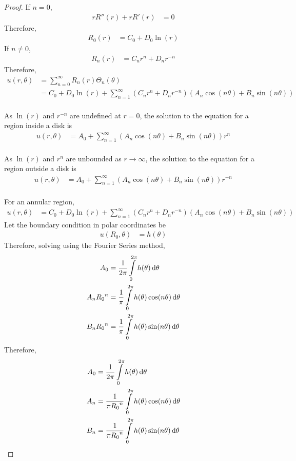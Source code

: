 \documentclass[titlepage, fleqn, a4paper, 12pt, twoside]{article}
\theoremstyle{definition}
\theoremstyle{theorem}
\begin{document}
\begin{proof}
	If $n = 0$,
	\begin{align*}
		r R''(r) + r R'(r) & = 0
	\end{align*}
	Therefore,
	\begin{align*}
		R_0(r) & = C_0 + D_0 \ln(r)
	\end{align*}
	If $n \neq 0$,
	\begin{align*}
		R_n(r) & = C_n r^n + D_n r^{-n}
	\end{align*}
	Therefore,
	\begin{align*}
		u(r,\theta) & = \sum\limits_{n = 0}^{\infty} R_n(r) \Theta_n(\theta) \\
                            & = C_0 + D_0 \ln(r) + \sum\limits_{n = 1}^{\infty} \left( C_n r^n + D_n r^{-n} \right) \left( A_n \cos(n \theta) + B_n \sin(n \theta) \right)
	\end{align*}
	~\\
	As $\ln(r)$ and $r^{-n}$ are undefined at $r = 0$, the solution to the equation for a region inside a disk is
	\begin{align*}
		u(r,\theta) & = A_0 + \sum\limits_{n = 1}^{\infty} \left( A_n \cos(n \theta) + B_n \sin(n \theta) \right) r^n
	\end{align*}
	~\\
	As $\ln(r)$ and $r^n$ are unbounded as $r \to \infty$, the solution to the equation for a region outside a disk is
	\begin{align*}
		u(r,\theta) & = A_0 + \sum\limits_{n = 1}^{\infty} \left( A_n \cos(n \theta) + B_n \sin(n \theta) \right) r^{-n}
	\end{align*}
	~\\
	For an annular region,
	\begin{align*}
		u(r,\theta) & = C_0 + D_0 \ln(r) + \sum\limits_{n = 1}^{\infty} \left( C_n r^n + D_n r^{-n} \right) \left( A_n \cos(n \theta) + B_n \sin(n \theta) \right)
	\end{align*}
	Let the boundary condition in polar coordinates be
	\begin{align*}
		u(R_0,\theta) & = h(\theta)
	\end{align*}
	Therefore, solving using the Fourier Series method,
	\begin{align*}
		A_0         & = \frac{1}{2 \pi} \int\limits_{0}^{2 \pi} h(\theta) \dif \theta              \\
		A_n {R_0}^n & = \frac{1}{\pi} \int\limits_{0}^{2 \pi} h(\theta) \cos(n \theta) \dif \theta \\
		B_n {R_0}^n & = \frac{1}{\pi} \int\limits_{0}^{2 \pi} h(\theta) \sin(n \theta) \dif \theta
	\end{align*}
	Therefore,
	\begin{align*}
		A_0 & = \frac{1}{2 \pi} \int\limits_{0}^{2 \pi} h(\theta) \dif \theta                      \\
		A_n & = \frac{1}{\pi {R_0}^n} \int\limits_{0}^{2 \pi} h(\theta) \cos(n \theta) \dif \theta \\
		B_n & = \frac{1}{\pi {R_0}^n} \int\limits_{0}^{2 \pi} h(\theta) \sin(n \theta) \dif \theta
	\end{align*}
\end{proof}
\end{document}
